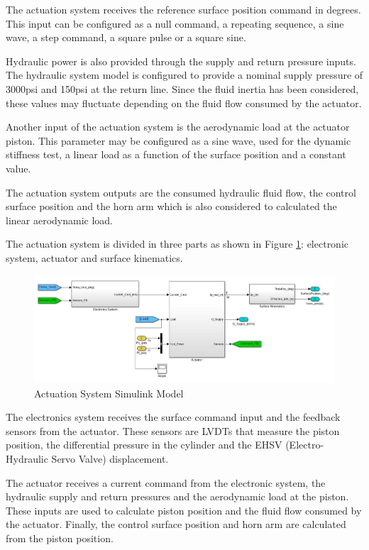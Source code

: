 The actuation system receives the reference surface position command in degrees. This input can be configured as a null command, a repeating sequence, a sine wave, a step command, a square pulse or a square sine.

Hydraulic power is also provided through the supply and return pressure inputs. The hydraulic system model is configured to provide a nominal supply pressure of 3000psi and 150psi at the return line. Since the fluid inertia has been considered, these values may fluctuate depending on the fluid flow consumed by the actuator.

Another input of the actuation system is the aerodynamic load at the actuator piston. This parameter may be configured as a sine wave, used for the dynamic stiffness test, a linear load as a function of the surface position and a constant value.

The actuation system outputs are the consumed hydraulic fluid flow, the control surface position and the horn arm which is also considered to calculated the linear aerodynamic load.

The actuation system is divided in three parts as shown in Figure \ref{fig:3_ActuationSystem}: electronic system, actuator and surface kinematics.

\begin{figure}[H]
	\centering
	\centerline{\includegraphics[width=1.1\textwidth]{Figuras/3.ActuationSystemModel/3-ActuationSystem.jpg}}
	\caption{Actuation System Simulink Model}
	\label{fig:3_ActuationSystem}
\end{figure}

The electronics system receives the surface command input and the feedback sensors from the actuator. These sensors are LVDTs that measure the piston position, the differential pressure in the cylinder and the EHSV (Electro-Hydraulic Servo Valve) displacement.

The actuator receives a current command from the electronic system, the hydraulic supply and return pressures and the aerodynamic load at the piston. These inputs are used to calculate piston position and the fluid flow consumed by the actuator. Finally, the control surface position and horn arm are calculated from the piston position. 

